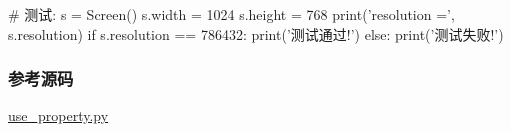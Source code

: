 \begin{pythoncode}
# 测试:
s = Screen()
s.width = 1024
s.height = 768
print('resolution =', s.resolution)
if s.resolution == 786432:
    print('测试通过!')
else:
    print('测试失败!')
\end{pythoncode}

\hypertarget{ux53c2ux8003ux6e90ux7801}{%
\subsubsection{参考源码}\label{ux53c2ux8003ux6e90ux7801}}

\href{https://github.com/michaelliao/learn-python3/blob/master/samples/oop_advance/use_property.py}{use\_property.py}

